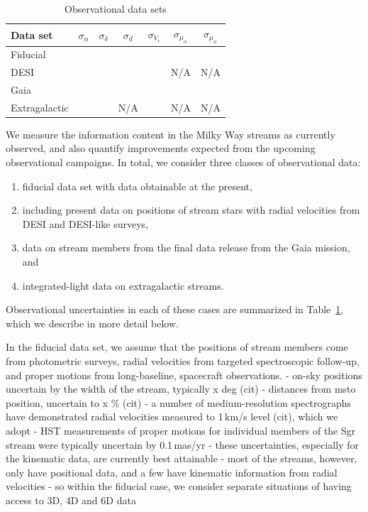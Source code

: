 \documentclass[modern]{aastex61}
\begin{document}
\begin{table}
\begin{center}
\begin{tabular}{l c c c c c c}
\hline
\hline
Data set & $\sigma_\alpha$ & $\sigma_\delta$ & $\sigma_d$ & $\sigma_{V_r}$ & $\sigma_{\mu_\alpha}$ & $\sigma_{\mu_\alpha}$ \\
\hline
Fiducial & & & & & & \\
DESI & & & & & N/A & N/A \\
Gaia & & & & & & \\
Extragalactic & & & N/A & & N/A & N/A \\
\hline
\hline
\end{tabular}
\caption{Observational data sets}
\label{t:datasets}
\end{center}
\end{table}

We measure the information content in the Milky Way streams as currently observed, and also quantify improvements expected from the upcoming observational campaigns.
In total, we consider three classes of observational data:
\begin{enumerate}
\item fiducial data set with data obtainable at the present,
\item including present data on positions of stream stars with radial velocities from DESI and DESI-like surveys,
\item data on stream members from the final data release from the Gaia mission, and
\item integrated-light data on extragalactic streams.
\end{enumerate}
Observational uncertainties in each of these cases are summarized in Table~\ref{t:datasets}, which we describe in more detail below.

In the fiducial data set, we assume that the positions of stream members come from photometric surveys, radial velocities from targeted spectroscopic follow-up, and proper motions from long-baseline, spacecraft observations.
- on-sky positions uncertain by the width of the stream, typically x deg (cit)
- distances from msto position, uncertain to x \% (cit)
- a number of medium-resolution spectrographs have demonstrated radial velocities measured to 1\,km/s level (cit), which we adopt
- HST measurements of proper motions for individual members of the Sgr stream were typically uncertain by 0.1\,mas/yr
- these uncertainties, especially for the kinematic data, are currently best attainable
- most of the streams, however, only have positional data, and a few have kinematic information from radial velocities
- so within the fiducial case, we consider separate situations of having access to 3D, 4D and 6D data
\end{document}
